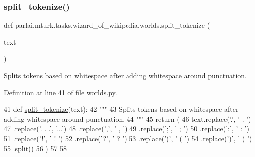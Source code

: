 \subsubsection{\texorpdfstring{split\+\_\+tokenize()}{split\_tokenize()}}
{\footnotesize\ttfamily def parlai.\+mturk.\+tasks.\+wizard\+\_\+of\+\_\+wikipedia.\+worlds.\+split\+\_\+tokenize (\begin{DoxyParamCaption}\item[{}]{text }\end{DoxyParamCaption})}

\begin{DoxyVerb}Splits tokens based on whitespace after adding whitespace around punctuation.
\end{DoxyVerb}
 

Definition at line 41 of file worlds.\+py.


\begin{DoxyCode}
41 \textcolor{keyword}{def }\hyperlink{namespaceparlai_1_1mturk_1_1tasks_1_1wizard__of__wikipedia_1_1worlds_a040aaf5ecfbddec14f321279454f85a8}{split\_tokenize}(text):
42     \textcolor{stringliteral}{"""}
43 \textcolor{stringliteral}{    Splits tokens based on whitespace after adding whitespace around punctuation.}
44 \textcolor{stringliteral}{    """}
45     \textcolor{keywordflow}{return} (
46         text.replace(\textcolor{stringliteral}{'.'}, \textcolor{stringliteral}{' . '})
47         .replace(\textcolor{stringliteral}{'. . .'}, \textcolor{stringliteral}{'...'})
48         .replace(\textcolor{stringliteral}{','}, \textcolor{stringliteral}{' , '})
49         .replace(\textcolor{stringliteral}{';'}, \textcolor{stringliteral}{' ; '})
50         .replace(\textcolor{stringliteral}{':'}, \textcolor{stringliteral}{' : '})
51         .replace(\textcolor{stringliteral}{'!'}, \textcolor{stringliteral}{' ! '})
52         .replace(\textcolor{stringliteral}{'?'}, \textcolor{stringliteral}{' ? '})
53         .replace(\textcolor{stringliteral}{'('}, \textcolor{stringliteral}{' ( '})
54         .replace(\textcolor{stringliteral}{')'}, \textcolor{stringliteral}{' ) '})
55         .split()
56     )
57 
58 
\end{DoxyCode}
